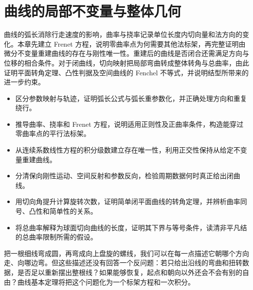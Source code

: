 
% 
% 

\chapter{曲线的局部不变量与整体几何}
\label{g1:ch:07}

\begin{chapterabstract}
	曲线的弧长消除行走速度的影响，曲率与挠率记录单位长度内切向量和法方向的变化。本章先建立 Frenet 方程，说明零曲率点为何需要其他法标架，再完整证明由微分不变量重建曲线的存在与刚性唯一性。重建后的曲线是否闭合还需满足方向与位移的相合条件。对于闭曲线，切向映射把局部弯曲转成整体转角与总曲率，由此证明平面转角定理、凸性判据及空间曲线的 Fenchel 不等式，并说明结型所带来的进一步约束。
\end{chapterabstract}

\begin{learninggoals}
	\begin{itemize}
		\item 区分参数映射与轨迹，证明弧长公式与弧长重参数化，并正确处理方向和重复绕行。
		\item 推导曲率、挠率和 Frenet 方程，说明适用正则性及正曲率条件，构造能穿过零曲率点的平行法标架。
		\item 从连续系数线性方程的积分级数建立存在唯一性，利用正交性保持从给定不变量重建曲线。
		\item 分清保向刚性运动、空间反射和参数反向，检验周期数据何时真正给出闭曲线。
		\item 用切向角提升计算旋转次数，证明简单闭平面曲线的转角定理，并辨析曲率同号、凸性和简单性的关系。
		\item 将总曲率解释为球面切向曲线的长度，证明其下界与等号条件，读清非平凡结的总曲率限制所需的假设。
	\end{itemize}
\end{learninggoals}

把一根细线弯成圆，再弯成向上盘旋的螺线，我们可以在每一点描述它朝哪个方向走、向哪边弯。但这些描述还没有回答一个反问题：若只给出沿线的弯曲和扭转数据，是否足以重新摆出整根线？如果能够恢复，起点和朝向以外还会不会有别的自由？曲线基本定理将把这个问题化为一个标架方程和一次积分。


